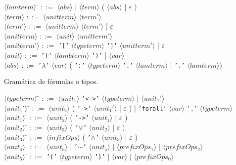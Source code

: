 \documentclass[a4paper,11pt]{article}
\theoremstyle{definition}
\begin{document}
\begin{tabbing}
$\langle lamterm \rangle$ \= $::=$ $\langle abs \rangle$ | $\langle term \rangle$ ( $\langle abs \rangle$ | $\varepsilon$ ) \\

$\langle term \rangle$ \> $::=$ $\langle unitterm \rangle$ $\langle term' \rangle$ \\

$\langle term' \rangle$ \> $::=$  $\langle unitterm \rangle$  $\langle term' \rangle$ | $\varepsilon$ \\

$\langle unitterm \rangle$ \> $::=$ $\langle unit \rangle$ $\langle unitterm' \rangle$ \\

$\langle unitterm' \rangle$ \> $::=$ \texttt{'['} $\langle typeterm \rangle$ \texttt{']'} $\langle unitterm' \rangle$ | $\varepsilon$ \\

$\langle unit \rangle$ \> $::=$ \texttt{'('} $\langle lambterm \rangle$ \texttt{')'} | $\langle var \rangle$ \\

$\langle abs \rangle$ \> $::=$ \texttt{'$\lambda$'} $\langle var \rangle$ ( \texttt{':'} $\langle typeterm \rangle$ \texttt{'.'} $\langle lamterm \rangle$
| \texttt{'.'} $\langle lamterm \rangle$)
\end{tabbing}

Gramática de fórmulas o tipos.

\begin{tabbing}
$\langle typeterm \rangle$ \= $::=$ $\langle unit_{1} \rangle$ \texttt{'<->'} $\langle typeterm \rangle$ | $\langle unit_{1}' \rangle$\\
$\langle unit_{1}' \rangle$ \= $::=$ $\langle unit_{2} \rangle$ ( \texttt{'->'} $\langle unit_{1}' \rangle$ | $\varepsilon$ ) 
| \texttt{'forall'} $\langle var \rangle$ \texttt{'.'} $\langle typeterm \rangle$\\
$\langle unit_{1} \rangle$ \= $::=$ $\langle unit_{2} \rangle$ ( \texttt{'->'} $\langle unit_{1} \rangle$ | $\varepsilon$ ) \\
$\langle unit_{2} \rangle$ \= $::=$ $\langle unit_{3} \rangle$ ( \texttt{'$\vee$'} $\langle unit_{2} \rangle$ | $\varepsilon$ ) \\
$\langle unit_{3} \rangle$ \= $::=$ $\langle infixOps \rangle$ ( \texttt{'$\wedge$'} $\langle unit_{3} \rangle$ | $\varepsilon$ ) \\
$\langle unit_{4} \rangle$ \= $::=$ $\langle unit_{5} \rangle$ | \texttt{'$\sim$'} $\langle unit_{4} \rangle$ |
$\langle prefixOps_{1} \rangle$ | $\langle prefixOps_{2} \rangle$ \\
$\langle unit_{5} \rangle$ \= $::=$ \texttt{'('} $\langle typeterm \rangle$ \texttt{')'} | $\langle var \rangle$ | 
$\langle prefixOps_{0} \rangle$

\end{tabbing}
\end{document}
